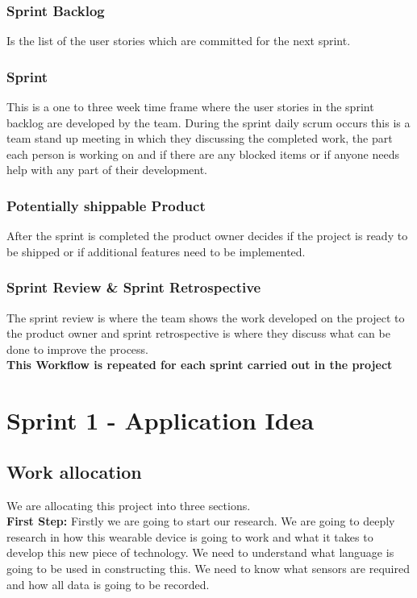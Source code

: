 \documentclass[a4paper,12pt]{report}
\begin{document}
\subsubsection{Sprint Backlog}
Is the list of the user stories which are committed for the next sprint.
\subsubsection{Sprint}
This is a one to three week time frame where the user stories in the sprint backlog are developed by the team. During the sprint daily scrum occurs this is a team stand up meeting in which they discussing the completed work, the part each person is working on and if there are any blocked items or if anyone needs help with any part of their development.
\subsubsection{Potentially shippable Product}
After the sprint is completed the product owner decides if the project is ready to be shipped or if additional features need to be implemented.
\subsubsection{Sprint Review \& Sprint Retrospective}
The sprint review is where the team shows the work developed on the project to the product owner and sprint retrospective is where they discuss what can be done to improve the process.\\
\textbf{This Workflow is repeated for each sprint carried out in the project}
\section{Sprint 1 - Application Idea}

\subsection{Work allocation}
We are allocating this project into three sections.\\

\textbf{First Step:}
Firstly we are going to start our research. We are going to deeply research in how this wearable device is going to work and what it takes to develop this new piece of technology. We need to understand what language is going to be used in constructing this. We need to know what sensors are required and how all data is going to be recorded.
\end{document}
